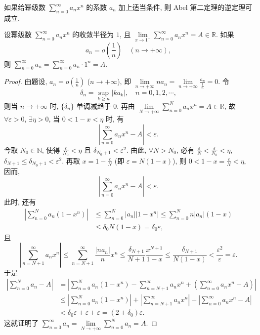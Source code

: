 如果给幂级数 $\sum_{n=0}^{\infty}a_{n}x^{n}$ 的系数 $a_{n}$ 加上适当条件, 则 Abel 第二定理的逆定理可成立.

\begin{theorem}[Tauber]\label{thm:14.1.6}
设幂级数 $\sum_{n=0}^{\infty}a_{n}x^{n}$ 的收敛半径为 $1$, 且 $\lim\limits_{x\to1^{-}}\sum_{n=0}^{\infty}a_{n}x^{n}=A\in\mathbb{R}$. 如果
\[
  a_{n}=o\left(\frac{1}{n}\right)\quad(n\to+\infty),
\]
则 $\sum_{n=0}^{\infty}a_{n}=\sum_{n=0}^{\infty}a_{n}\cdot1^{n}=A$.
\end{theorem}

\begin{proof}
由题设, $a_{n}=o\left(\frac{1}{n}\right)$ ($n\to+\infty$), 即 $\lim\limits_{n\to+\infty}na_{n}=\lim\limits_{n\to+\infty}\frac{a_{n}}{\frac{1}{n}}=0$. 令
\[
  \delta_{n}=\sup_{k\geqslant n}|ka_{k}|,\quad n=0,1,2,\cdots,
\]
则当 $n\to+\infty$ 时, $\{\delta_{n}\}$ 单调减趋于 $0$. 再由 $\lim\limits_{N\to+\infty}\sum_{n=0}^{N}a_{n}x^{n}=A\in\mathbb{R}$, 故 $\forall\varepsilon>0$, $\exists\eta>0$, 当 $0<1-x<\eta$ 时, 有
\[
  \left|\sum_{n=0}^{\infty}a_{n}x^{n}-A\right|<\varepsilon.
\]
今取 $N_{0}\in\mathbb{N}$, 使得 $\frac{\varepsilon}{N_{0}}<\eta$ 且 $\delta_{N_{0}+1}<\varepsilon^{2}$. 由此, $\forall N>N_{0}$, 必有 $\frac{\varepsilon}{N}<\frac{\varepsilon}{N_{0}}<\eta$, $\delta_{N+1}\leqslant\delta_{N_{0}+1}<\varepsilon^{2}$. 再取 $x=1-\frac{\varepsilon}{N}$ (即 $\varepsilon=N(1-x)$), 则 $0<1-x=\frac{\varepsilon}{N}<\eta$, 因而,
\[
  \left|\sum_{n=0}^{\infty}a_{n}x^{n}-A\right|<\varepsilon.
\]
此时, 还有
\[
  \begin{aligned}
    \left|\sum_{n=0}^{N}a_{n}(1-x^{n})\right|&\leqslant\sum_{n=0}^{N}|a_{n}||1-x^{n}|\leqslant\sum_{n=0}^{N}n|a_{n}|(1-x)\\
    &\leqslant\delta_{0}N(1-x)=\delta_{0}\varepsilon,
  \end{aligned}
\]
且
\[
  \left|\sum_{n=N+1}^{\infty}a_{n}x^{n}\right|\leqslant\sum_{n=N+1}^{\infty}\frac{|na_{n}|}{n}x^{n}\leqslant\frac{\delta_{N+1}}{N+1}\frac{x^{N+1}}{1-x}\leqslant\frac{\delta_{N+1}}{N(1-x)}<\frac{\varepsilon^{2}}{\varepsilon}=\varepsilon.
\]
于是
\[
  \begin{aligned}
    \left|\sum_{n=0}^{N}a_{n}-A\right|&=\left|\sum_{n=0}^{N}a_{n}(1-x^{n})-\sum_{n=N+1}^{\infty}a_{n}x^{n}+\left(\sum_{n=0}^{\infty}a_{n}x^{n}-A\right)\right|\\
    &\leqslant\left|\sum_{n=0}^{N}a_{n}(1-x^{n})\right|+\left|\sum_{n=N+1}^{\infty}a_{n}x^{n}\right|+\left|\sum_{n=0}^{\infty}a_{n}x^{n}-A\right|\\
    &<\delta_{0}\varepsilon+\varepsilon+\varepsilon=(2+\delta_{0})\varepsilon.
  \end{aligned}
\]
这就证明了 $\sum_{n=0}^{\infty}a_{n}=\lim\limits_{N\to+\infty}\sum_{n=0}^{N}a_{n}=A$.
\end{proof}


